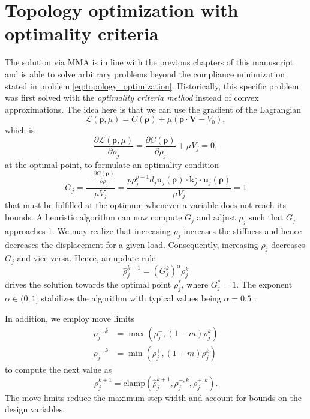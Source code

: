 \section{Topology optimization with optimality criteria}
The solution via MMA is in line with the previous chapters of this manuscript and is able to solve arbitrary problems beyond the compliance minimization stated in problem \eqref{eq:topology_optimization}. Historically, this specific problem was first solved with the \emph{optimality criteria method} instead of convex approximations. The idea here is that we can use the gradient of the Lagrangian
\begin{equation}
    \mathcal{L}(\pmb{\rho}, \mu) = C(\pmb{\rho}) + \mu \left( \pmb{\rho} \cdot \mathbf{V} - V_0 \right),
\end{equation}
which is
\begin{equation}
    \frac{\partial \mathcal{L} (\pmb{\rho}, \mu)}{\partial\rho_j} 
    = \frac{\partial C(\pmb{\rho})}{\partial \rho_j} + \mu V_j = 0,
\end{equation}
at the optimal point, to formulate an optimality condition
\begin{equation}
    G_j = \frac{-\frac{\partial C(\pmb{\rho})}{\partial \rho_j}}{\mu V_j} = \frac{p \rho_j^{p-1} d_j \mathbf{u}_j(\pmb{\rho})  \cdot \mathbf{k}^0_j \cdot \mathbf{u}_j(\pmb{\rho})}{\mu V_j} = 1
\end{equation}
that must be fulfilled at the optimum whenever a variable does not reach its bounds.
A heuristic algorithm can now compute $G_j$ and adjust $\rho_j$ such that $G_j$ approaches 1. We may realize that increasing $\rho_j$ increases the stiffness and hence decreases the displacement for a given load. Consequently, increasing $\rho_j$ decreases $G_j$ and vice versa. Hence, an update rule 
\begin{equation}
    \hat{\rho}_j^{k+1} = \left(G_j^k\right)^\alpha \rho_j^k
\end{equation}
drives the solution towards the optimal point $\rho_j^*$, where $G^*_j=1$. The exponent $\alpha \in (0,1]$ stabilizes the algorithm with typical values being $\alpha=0.5$ \cite{Harzheim2014}.

In addition, we employ move limits 
\begin{align}
    \rho_j^{-,k} &= \max \left(\rho_j^-, (1-m)\rho_j^k \right) \\
    \rho_j^{+,k} &= \min \left(\rho_j^+, (1+m)\rho_j^k \right)
\end{align}
to compute the next value as 
\begin{equation}
    \rho_j^{k+1} = \textrm{clamp} \left(\hat{\rho}_j^{k+1}, \rho_j^{-,k}, \rho_j^{+,k} \right).
\end{equation}
The move limits reduce the maximum step width and account for bounds on the design variables. 

